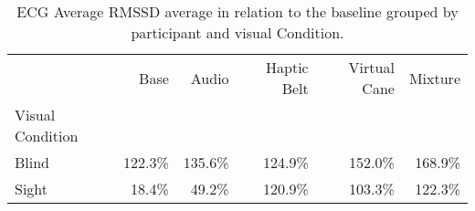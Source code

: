 
\begin{table}[!htb]
\centering
\caption{ECG Average RMSSD average in relation to the baseline grouped by participant and visual Condition.}
\label{tab:ecg_rmssd_average_group}
\begin{tabular}{lrrrrr}
\toprule
{} &     Base &    Audio & Haptic Belt & Virtual Cane &  Mixture \\
Visual Condition &          &          &             &              &          \\
\midrule
Blind            &  122.3\% &  135.6\% &     124.9\% &      152.0\% &  168.9\% \\
Sight            &   18.4\% &   49.2\% &     120.9\% &      103.3\% &  122.3\% \\
\bottomrule
\end{tabular}
\end{table}

